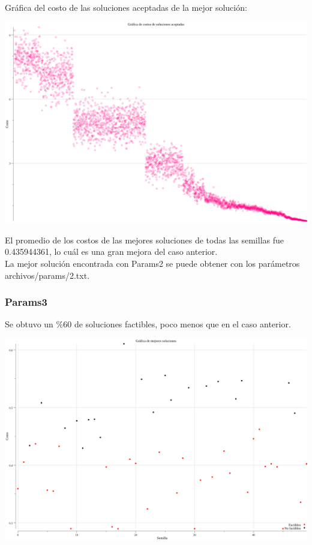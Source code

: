 \documentclass[12pt]{article}
\begin{document}
Gráfica del costo de las soluciones aceptadas de la mejor solución: \\

\begin{center}
\includegraphics[scale=0.3]{../archivos/graficas/soluciones-aceptadas/costos2.png} \\
\end{center}

El promedio de los costos de las mejores soluciones de todas las semillas fue 0.435944361, lo cuál es una gran mejora del caso anterior. \\

La mejor solución encontrada con Params2 se puede obtener con los parámetros \textsf{archivos/params/2.txt}.

\newpage

\subsubsection*{Params3}

Se obtuvo un $\%$60 de soluciones factibles, poco menos que en el caso anterior. \\

\begin{center}
  \includegraphics[scale=0.25]{../archivos/graficas/mejores-soluciones/soluciones3.png} \\
\end{center}
  
\end{document}
